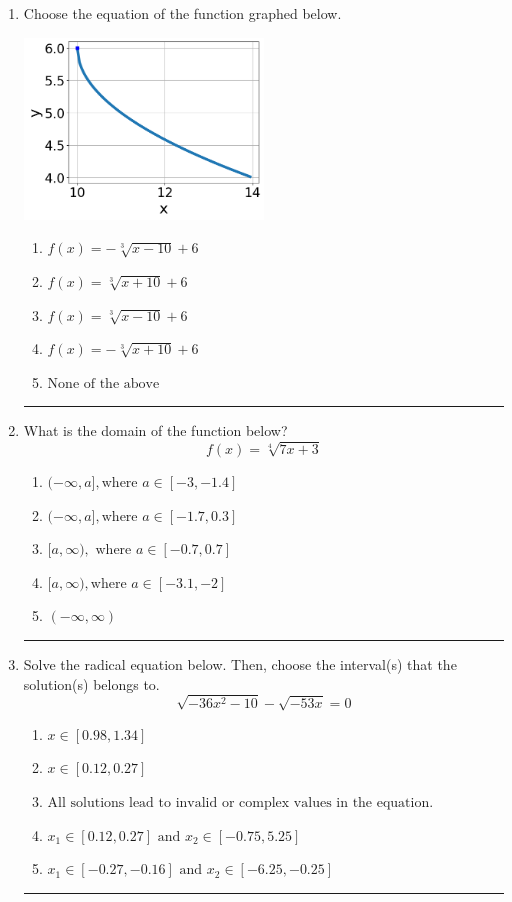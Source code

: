 \documentclass[14pt]{extbook}
\newcommand{\litem}[1]{\item#1\hspace*{-1cm}\rule{\textwidth}{0.4pt}}
\begin{document}
\begin{enumerate}
{\begin{enumerate}[label=\Alph*.]
\end{enumerate} }
\litem{
Choose the equation of the function graphed below.
\begin{center}
    \includegraphics[width=0.5\textwidth]{../Figures/radicalGraphToEquationCopyB.png}
\end{center}
\begin{enumerate}[label=\Alph*.]
\item \( f(x) = - \sqrt[3]{x - 10} + 6 \)
\item \( f(x) = \sqrt[3]{x + 10} + 6 \)
\item \( f(x) = \sqrt[3]{x - 10} + 6 \)
\item \( f(x) = - \sqrt[3]{x + 10} + 6 \)
\item \( \text{None of the above} \)

\end{enumerate} }
\litem{
What is the domain of the function below?\[ f(x) = \sqrt[4]{7 x + 3} \]\begin{enumerate}[label=\Alph*.]
\item \( (-\infty, a], \text{where } a \in [-3, -1.4] \)
\item \( (-\infty, a], \text{where } a \in [-1.7, 0.3] \)
\item \( [a, \infty), \text{ where } a \in [-0.7, 0.7] \)
\item \( [a, \infty), \text{where } a \in [-3.1, -2] \)
\item \( (-\infty, \infty) \)

\end{enumerate} }
\litem{
Solve the radical equation below. Then, choose the interval(s) that the solution(s) belongs to.\[ \sqrt{-36 x^2 - 10} - \sqrt{-53 x} = 0 \]\begin{enumerate}[label=\Alph*.]
\item \( x \in [0.98,1.34] \)
\item \( x \in [0.12,0.27] \)
\item \( \text{All solutions lead to invalid or complex values in the equation.} \)
\item \( x_1 \in [0.12, 0.27] \text{ and } x_2 \in [-0.75,5.25] \)
\item \( x_1 \in [-0.27, -0.16] \text{ and } x_2 \in [-6.25,-0.25] \)


\end{enumerate}}
\end{enumerate}
\end{document}
